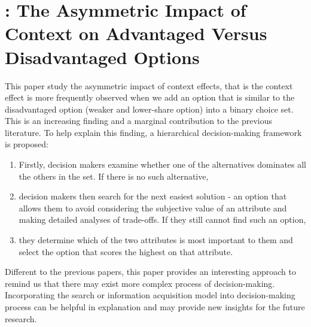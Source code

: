 \documentclass[11pt]{elegantbook}
\begin{document}
\section{\cite{evangelidis2018asymmetric}: The Asymmetric Impact of Context on Advantaged Versus Disadvantaged Options}
This paper study the asymmetric impact of context effects, that is the context effect is more frequently observed when we add an option that is similar to the disadvantaged option (weaker and lower-share option) into a binary choice set. This is an increasing finding and a marginal contribution to the previous literature. To help explain this finding, a hierarchical decision-making framework is proposed:
\begin{enumerate}
    \item Firstly, decision makers examine whether one of the alternatives dominates all the others in the set. If there is no such alternative,
    \item decision makers then search for the next easiest solution - an option that allows them to avoid considering the subjective value of an attribute and making detailed analyses of trade-offs. If they still cannot find such an option,
    \item they determine which of the two attributes is most important to them and select the option that scores the highest on that attribute.
\end{enumerate}
Different to the previous papers, this paper provides an interesting approach to remind us that there may exist more complex process of decision-making. Incorporating the search or information acquisition model into decision-making process can be helpful in explanation and may provide new insights for the future research.










































































\end{document}
